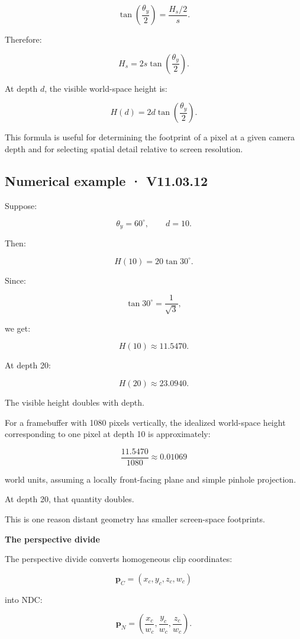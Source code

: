 \[
 \tan\left(\frac{\theta_y}{2}\right) = \frac{H_s/2}{s}.
\]

Therefore:

\[
 \boxed{ H_s=2s\tan\left(\frac{\theta_y}{2}\right) }.
\]

At depth \(d\), the visible world-space height is:

\[
 \boxed{ H(d)=2d\tan\left(\frac{\theta_y}{2}\right) }.
\]

This formula is useful for determining the footprint of a pixel at a given camera depth and for selecting spatial detail relative to screen resolution.

\subsection{Numerical example · V11.03.12}\label{02-foundations-ii-ch033-numerical-example-v11.03.12}

Suppose:

\[
 \theta_y=60^\circ, \qquad d=10.
\]

Then:

\[
 H(10)=20\tan30^\circ.
\]

Since:

\[
 \tan30^\circ=\frac1{\sqrt3},
\]

we get:

\[
 \boxed{ H(10)\approx11.5470 }.
\]

At depth 20:

\[
 H(20)\approx23.0940.
\]

The visible height doubles with depth.

For a framebuffer with 1080 pixels vertically, the idealized world-space height corresponding to one pixel at depth 10 is approximately:

\[
 \frac{11.5470}{1080}\approx0.01069
\]

world units, assuming a locally front-facing plane and simple pinhole projection.

At depth 20, that quantity doubles.

This is one reason distant geometry has smaller screen-space footprints.

\textbf{The perspective divide}

The perspective divide converts homogeneous clip coordinates:

\[
 \mathbf p_C= (x_c,y_c,z_c,w_c)
\]

into NDC:

\[
 \boxed{ \mathbf p_N= \left( \frac{x_c}{w_c}, \frac{y_c}{w_c}, \frac{z_c}{w_c} \right) }.
\]

